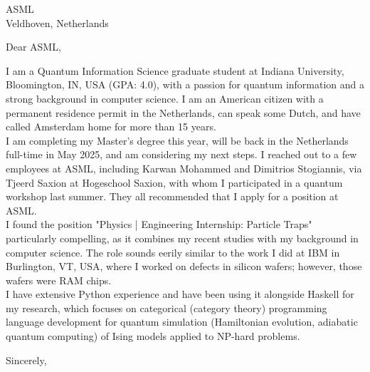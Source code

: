 \documentclass[11pt]{letter}
\begin{document}
\begin{letter}{
ASML \\
Veldhoven, Netherlands}

\opening{Dear ASML,}

I am a Quantum Information Science graduate student at Indiana University, Bloomington, IN, USA (GPA: 4.0), with a passion for quantum information and a strong background in computer science. I am an American citizen with a permanent residence permit in the Netherlands, can speak some Dutch, and have called Amsterdam home for more than 15 years.\\

I am completing my Master's degree this year, will be back in the Netherlands full-time in May 2025, and am considering my next steps. I reached out to a few employees at ASML, including Karwan Mohammed and Dimitrios Stogiannis, via Tjeerd Saxion at Hogeschool Saxion, with whom I participated in a quantum workshop last summer. They all recommended that I apply for a position at ASML.\\

I found the position "Physics | Engineering Internship: Particle Traps" particularly compelling, as it combines my recent studies with my background in computer science. The role sounds eerily similar to the work I did at IBM in Burlington, VT, USA, where I worked on defects in silicon wafers; however, those wafers were RAM chips.\\

I have extensive Python experience and have been using it alongside Haskell for my research, which focuses on categorical (category theory) programming language development for quantum simulation (Hamiltonian evolution, adiabatic quantum computing) of Ising models applied to NP-hard problems.

\closing{Sincerely,}

\end{letter}
\end{document}
